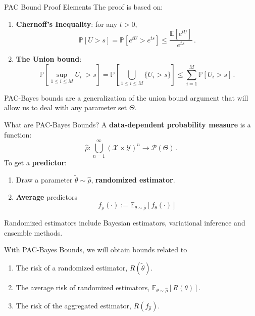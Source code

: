 \documentclass[aspectratio=159]{beamer}
\begin{document}
    \begin{frame}{PAC Bound Proof Elements}
        The proof is based on:
        \begin{enumerate}
            \item \textbf{Chernoff's Inequality}: for any \(t > 0\),
            \[
                \mathbb{P}[U > s] = \mathbb{P}\left[e^{tU}>e^{ts}\right] \leq \frac{\mathbb{E}\left[e^{tU}\right]}{e^{ts}}\,.
            \]
            \item \textbf{The Union bound}:
            \[
                \mathbb{P}\left[ \sup_{1\leq i \leq M}  U_i\ > s\right] = \mathbb{P}\left[ \bigcup_{1\leq i \leq M} \{U_i > s\}\right] \leq \sum_{i=1}^M \mathbb{P}\left[ U_i > s\right]\,.
            \]
        \end{enumerate}
        \pause
        PAC-Bayes bounds are a generalization of the union bound argument that will allow us to deal with any parameter set \(\Theta\).
    \end{frame}

    \begin{frame}{What are PAC-Bayes Bounds?}
        A \textbf{data-dependent probability measure} is a function:
        \[
            \hat{\rho}: \bigcup_{n=1}^{\infty} (\mathcal{X} \times \mathcal{Y})^n \to \mathcal{P}(\Theta)\,.
        \]
        To get a \textbf{predictor}:
        \begin{enumerate}
            \item Draw a parameter \(\tilde{\theta} \sim \hat{\rho}\), \textbf{randomized estimator}.
            \item \textbf{Average} predictors
            \[
                f_{\hat{\rho}}(\cdot) := \mathbb{E}_{\theta \sim \hat{\rho}}[f_\theta(\cdot)]
            \]
        \end{enumerate}

        Randomized estimators include Bayesian estimators, variational inference and ensemble methods.
    \end{frame}
    \begin{frame}
        With PAC-Bayes Bounds, we will obtain bounds related to
        \begin{enumerate}
            \item The risk of a randomized estimator, \(R(\tilde{\theta})\).
            \item The average risk of randomized estimators, \(\mathbb{E}_{\theta \sim \hat{\rho}}[R(\theta)]\).
            \item The risk of the aggregated estimator, \(R(f_{\hat{\rho}})\).
        \end{enumerate}
    \end{frame}
\end{document}
